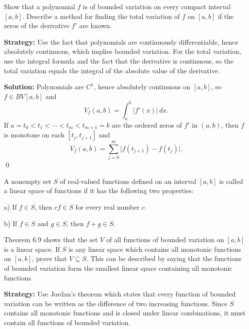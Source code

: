 \begin{problembox}
\begin{problemstatement}
Show that a polynomial $f$ is of bounded variation on every compact interval $[a, b]$. Describe a method for finding the total variation of $f$ on $[a, b]$ if the zeros of the derivative $f'$ are known.
\end{problemstatement}
\end{problembox}

\noindent\textbf{Strategy:} Use the fact that polynomials are continuously differentiable, hence absolutely continuous, which implies bounded variation. For the total variation, use the integral formula and the fact that the derivative is continuous, so the total variation equals the integral of the absolute value of the derivative.

\bigskip\noindent\textbf{Solution:}
Polynomials are $C^1$, hence absolutely continuous on $[a,b]$, so $f\in BV[a,b]$ and
\[V_f(a,b)=\int_a^b |f'(x)|\,dx.\]
If $a=t_0<t_1<\cdots<t_m<t_{m+1}=b$ are the ordered zeros of $f'$ in $(a,b)$, then $f$ is monotone on each $[t_j,t_{j+1}]$ and
\[V_f(a,b)=\sum_{j=0}^{m}\big|f(t_{j+1})-f(t_j)\big|.\]\qed


\begin{problembox}
\begin{problemstatement}
A nonempty set $S$ of real-valued functions defined on an interval $[a, b]$ is called a linear space of functions if it has the following two properties:

a) If $f \in S$, then $cf \in S$ for every real number $c$.

b) If $f \in S$ and $g \in S$, then $f + g \in S$.

Theorem 6.9 shows that the set $V$ of all functions of bounded variation on $[a, b]$ is a linear space. If $S$ is any linear space which contains all monotonic functions on $[a, b]$, prove that $V \subseteq S$. This can be described by saying that the functions of bounded variation form the smallest linear space containing all monotonic functions.
\end{problemstatement}
\end{problembox}

\noindent\textbf{Strategy:} Use Jordan's theorem which states that every function of bounded variation can be written as the difference of two increasing functions. Since $S$ contains all monotonic functions and is closed under linear combinations, it must contain all functions of bounded variation.

